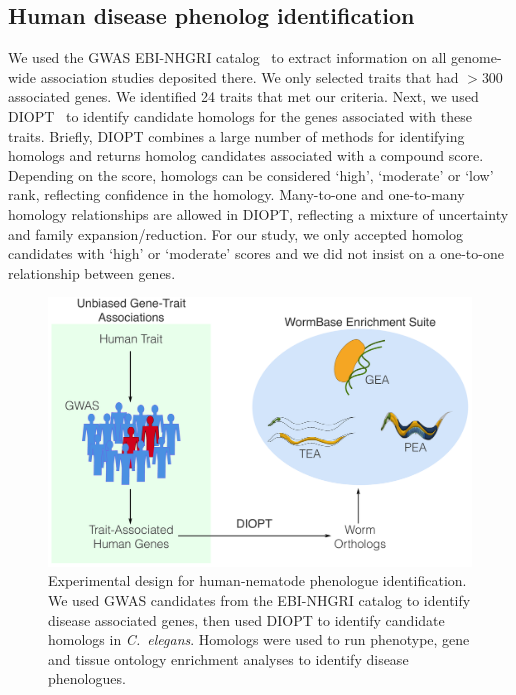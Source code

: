 \documentclass[10pt,letterpaper,twocolumn]{article}
\newcommand{\cel}{\emph{C.~elegans}}
\begin{document}
\subsection*{Human disease phenolog identification}
We used the GWAS EBI-NHGRI catalog~\cite{MacArthur2016} to extract information
on all genome-wide
association studies deposited there. We only selected traits that had $>300$
associated genes. We identified 24 traits that met our criteria. Next, we used
DIOPT~\cite{Hu2011} to identify candidate homologs for the genes associated with these
traits. Briefly, DIOPT combines a large number of methods for identifying homologs
and returns homolog candidates associated with a compound score. Depending on the score,
homologs can be considered `high', `moderate' or `low' rank, reflecting confidence
in the homology. Many-to-one and one-to-many homology relationships are allowed
in DIOPT, reflecting a mixture of uncertainty and family expansion/reduction.
For our study, we only accepted homolog candidates with `high' or `moderate' scores
and we did not insist on a one-to-one relationship between genes.

\begin{figure}[htbp]
  \renewcommand{\familydefault}{\sfdefault}\normalfont{}
  \centering
  \includegraphics[width=\linewidth]{gwas-design.pdf}
  \caption{Experimental design for human-nematode phenologue identification.
           We used GWAS candidates from the EBI-NHGRI catalog to identify
           disease associated genes, then used DIOPT to identify candidate
           homologs in \cel{}. Homologs were used to run phenotype, gene
           and tissue ontology enrichment analyses to identify disease
           phenologues.}
\label{fig:gwas}
\end{figure}
\end{document}
